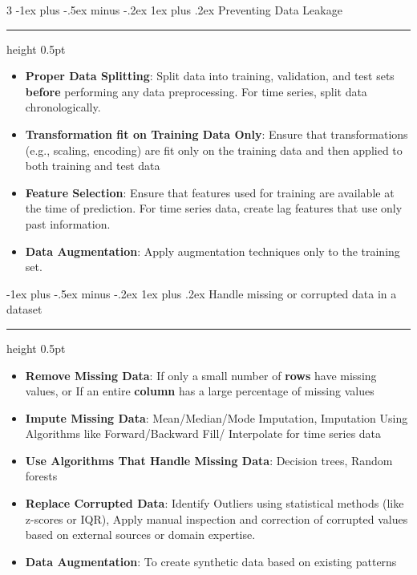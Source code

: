 \documentclass[letterpaper, 10.5pt,landscape]{article}
\makeatletter
\renewcommand{\subsubsection}{\@startsection{subsubsection}{3}{0mm}%
                                {-1ex plus -.5ex minus -.2ex}%
                                {1ex plus .2ex}%
                                {\normalfont\small\bfseries}}
\makeatother
\begin{document}
\begin{multicols*}{3}
\subsubsection{Preventing Data Leakage} {\color{teal}\hrule height 0.5pt} \smallskip

\begin{itemize} [leftmargin=0.5cm]
    \item \textbf{Proper Data Splitting}: Split data into training, validation, and test sets \textbf{before} performing any data preprocessing. For time series, split data chronologically.
    \vspace{-3pt}
    \item \textbf{Transformation fit on Training Data Only}: Ensure that transformations (e.g., scaling, encoding) are fit only on the training data and then applied to both training and test data
    \item \textbf{Feature Selection}: Ensure that features used for training are available at the time of prediction. For time series data, create lag features that use only past information.
    \vspace{-3pt}
    \item \textbf{Data Augmentation}: Apply augmentation techniques only to the training set. 
\end{itemize}



\subsubsection{Handle missing or corrupted data in a dataset} {\color{teal}\hrule height 0.5pt} \smallskip

\begin{itemize} [leftmargin=0.5cm]
    \item \textbf{Remove Missing Data}: If only a small number of \textbf{rows} have missing values, or If an entire \textbf{column} has a large percentage of missing values
    \vspace{-3pt}
    \item \textbf{Impute Missing Data}: Mean/Median/Mode Imputation, Imputation Using Algorithms like Forward/Backward Fill/ Interpolate for time series data
    \item \textbf{Use Algorithms That Handle Missing Data}: Decision trees, Random forests
    \vspace{-3pt}
    \item \textbf{Replace Corrupted Data}: Identify Outliers using statistical methods (like z-scores or IQR), Apply manual inspection and correction of corrupted values based on external sources or domain expertise.
    \vspace{-3pt}
    \item \textbf{Data Augmentation}: To create synthetic data based on existing patterns
\end{itemize}




\end{multicols*}
\end{document}

